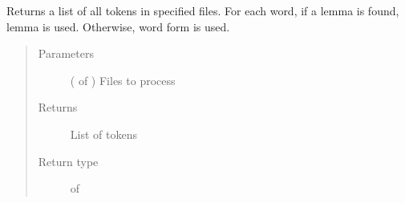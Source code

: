 \documentclass[letterpaper,10pt,english]{sphinxmanual}
\begin{document}
\begin{fulllineitems}
\label{\detokenize{learning:loacore.learning.word_embeddings.get_tokens_list}}
Returns a list of all tokens in specified files. For each word, if a lemma is found, lemma is used. Otherwise, word
form is used.
\begin{quote}\begin{description}
\item[{Parameters}] \leavevmode
{} ( of {\hyperref[\detokenize{classes:loacore.classes.classes.File}]{}}) \textendash{} Files to process

\item[{Returns}] \leavevmode
List of tokens

\item[{Return type}] \leavevmode
{} of 

\end{description}\end{quote}

\end{fulllineitems}

\end{document}
